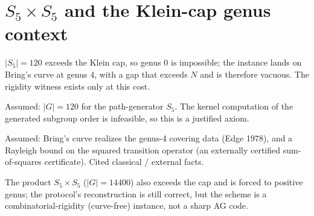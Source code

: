 \chapter{$S_5\times S_5$ and the Klein-cap genus context}

\begin{definition}
  \label{def:s5_instance}
  \rocqok
  $|S_5|=120$ exceeds the Klein cap, so genus 0 is impossible; the instance
  lands on Bring's curve at genus $4$, with a gap that exceeds $N$ and is
  therefore vacuous. The rigidity witness exists only at this cost.
\end{definition}

\begin{definition}
  \label{ax:s5_group_order}
  Assumed: $|G| = 120$ for the path-generator $S_5$. The kernel computation of
  the generated subgroup order is infeasible, so this is a justified axiom.
\end{definition}

\begin{definition}
  \label{ax:s5_brings}
  Assumed: Bring's curve realizes the genus-4 covering data (Edge 1978), and a
  Rayleigh bound on the squared transition operator (an externally certified
  sum-of-squares certificate). Cited classical / external facts.
\end{definition}

\begin{definition}
  \label{def:s5x5_instance}
  \rocqok
  The product $S_5\times S_5$ ($|G|=14400$) also exceeds the cap and is forced
  to positive genus; the protocol's reconstruction is still correct, but the
  scheme is a combinatorial-rigidity (curve-free) instance, not a sharp AG code.
\end{definition}

